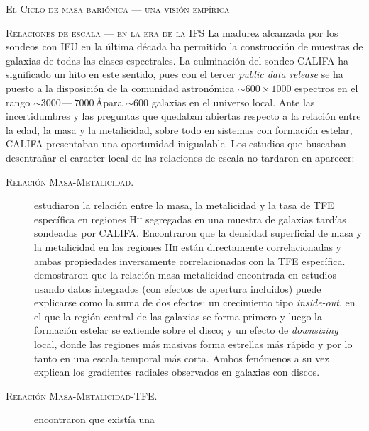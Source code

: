 \documentclass[xcolor=dvipsnames,4pt,hyperref={colorlinks,citecolor=black,linkcolor=black,urlcolor=black}]{beamer}
\begin{document}
\begin{frame}[allowframebreaks]{\textsc{El Ciclo de masa bariónica --- una visión empírica}}
%
\end{frame}

\begin{frame}[allowframebreaks]{\textsc{Relaciones de escala --- en la era de la IFS}}
%
La madurez alcanzada por los sondeos con IFU en la última década ha permitido la construcción de
muestras de galaxias de todas las clases espectrales. La culminación del sondeo CALIFA
\citep{Sanchez2012, Sanchez2016} ha significado un hito en este sentido, pues con el tercer
\emph{public data release} se ha puesto a la disposición de la comunidad astronómica
$\sim600\times1000$ espectros en el rango $\sim3000\,$---$\,7000\,$\AA para $\sim600$ galaxias en el
universo local.
%
Ante las incertidumbres y las preguntas que quedaban abiertas respecto a la relación entre la edad,
la masa y la metalicidad, sobre todo en sistemas con formación estelar, CALIFA presentaban una
oportunidad inigualable. Los estudios que buscaban desentrañar el caracter local de las relaciones
de escala no tardaron en aparecer:
%
\begin{description}
%
\item[\textsc{Relación Masa-Metalicidad.}] \citet{Rosales2012} estudiaron la relación entre la masa,
la metalicidad y la tasa de TFE específica en regiones H\textsc{ii} segregadas en una muestra de
galaxias tardías sondeadas por CALIFA. Encontraron que la densidad superficial de masa y la
metalicidad en las regiones H\textsc{ii} están directamente correlacionadas y ambas propiedades
inversamente correlacionadas con la TFE específica. \citeauthor{Rosales2012} demostraron que la
relación masa-metalicidad encontrada en estudios usando datos integrados (con efectos de apertura
incluidos) puede explicarse como la suma de dos efectos: un crecimiento tipo \emph{inside-out}, en
el que la región central de las galaxias se forma primero y luego la formación estelar se extiende
sobre el disco; y un efecto de \emph{downsizing} local, donde las regiones más masivas forma
estrellas más rápido y por lo tanto en una escala temporal más corta. Ambos fenómenos a su vez
explican los gradientes radiales observados en galaxias con discos.
%
\item[\textsc{Relación Masa-Metalicidad-TFE.}] \citeauthor{Rosales2012} encontraron que existía una

\end{description}
\end{frame}
\end{document}
